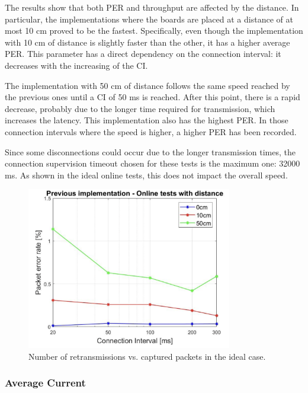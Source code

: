 \documentclass{Configuration_Files/PoliMi3i_thesis}
\begin{document}
The results show that both PER and throughput are affected by the distance. In particular, the implementations where the boards are placed at a distance of at most 10 cm proved to be the fastest. Specifically, even though the implementation with 10 cm of distance is slightly faster than the other, it has a higher average PER. This parameter has a direct dependency on the connection interval: it decreases with the increasing of the CI.

The implementation with 50 cm of distance follows the same speed reached by the previous ones until a CI of 50 ms is reached. After this point, there is a rapid decrease, probably due to the longer time required for transmission, which increases the latency. This implementation also has the highest PER. In those connection intervals where the speed is higher, a higher PER has been recorded.

Since some disconnections could occur due to the longer transmission times, the connection supervision timeout chosen for these tests is the maximum one: 32000 ms. As shown in the ideal online tests, this does not impact the overall speed.

\begin{figure}[H]
    \centering
    \includegraphics[width=0.8\textwidth]{Results Manuel/figure5}
    \caption{Number of retransmissions vs. captured packets in the ideal case.}
    \label{fig:figure1}
\end{figure}

\subsubsection*{Average Current}
\end{document}
